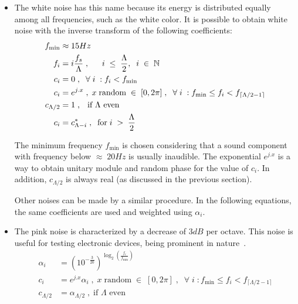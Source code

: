\begin{itemize}
 \item The white noise has this name because its energy is distributed equally among all frequencies, such as the white color. It is possible to obtain white noise with the inverse transform of the following coefficients:
\begin{equation}\label{eq:branco}
 \begin{split}
f_{\text{min}} & \approx 15 Hz \\
f_i  &= i \frac{f_s}{\Lambda} \;, \;\; \quad i \;\leq\; \frac{\Lambda}{2},\;\; i\;\in\;\mathbb{N}  \\
c_i & =0\;,\;\; \forall \; i \; : f_i<f_{\text{min}} \\
c_i & =e^{j.x} \;, \; x \; \text{random} \; \in \; [0,2\pi]\;,\;\; \forall \; i \; : f_{\text{min}} \le f_i < f_{\lceil \Lambda/2-1 \rceil}  \\
 c_{\Lambda/2} & = 1 \; \text{, \; if $\Lambda$ even}\\ 
 c_i & = c_{\Lambda - i}^*\;,\;\; \text{for}\;  i \; > \;  \frac{\Lambda}{2}
 \end{split}
\end{equation}

\noindent The minimum frequency $f_{\text{min}}$ is chosen considering that a sound component with frequency below 
		$\approx\; 20Hz$ is usually inaudible.
The exponential $e^{j.x}$ is a way to obtain unitary module and random phase for the value of $c_i$.
		In addition, $c_{\Lambda/2}$ is always real (as discussed in the previous section).

Other noises can be made by a similar procedure.
In the following equations, the same coefficients are used
and weighted using $\alpha_i$.

 \item The pink noise is characterized by a decrease of $3dB$ per octave. This noise is useful for testing electronic devices, being prominent in nature~\cite{Roederer}. 
\begin{equation}\label{eq:rosa}
\begin{split}
	\alpha_i & = \left(10^{-\frac{3}{20}}\right)^{\log _2 \left ( \frac{f_i}{f_{\text{min}}} \right )}  \\
	c_i & =e^{j.x} \alpha_i\;, \; x \; \text{random} \; \in \; [0,2\pi]\;,\;\; \forall \; i \; : f_{\text{min}} \le f_i < f_{\lceil \Lambda/2-1 \rceil}  \\
	c_{\Lambda/2} & = \alpha_{\Lambda/2}\;, \; \text{if $\Lambda$ even} \\ 
\end{split}
\end{equation}


\end{itemize}
